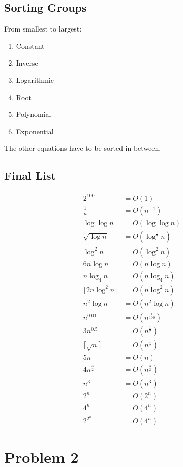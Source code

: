 \documentclass{article}
\begin{document}
\subsection{Sorting Groups}

From smallest to largest:
\begin{enumerate}
    \item Constant
    \item Inverse
    \item Logarithmic
    \item Root
    \item Polynomial
    \item Exponential
\end{enumerate}

\vspace{5mm}
The other equations have to be sorted in-between.

\subsection{Final List}
\setcounter{equation}{0}
\begin{align}
    2^{100} &= O(1) \\
    \frac{1}{n} &= O(n^{-1}) \\
    \log \log n &= O(\log \log n) \\
    \sqrt{\log n} &= O(\log^{\frac{1}{2}}n) \\
    \log^2 n &= O(\log^2 n) \\
    6n\log n &= O(n\log n) \\
    n \log_4 n &= O(n \log_4 n) \\
    \lfloor 2n \log^2n \rfloor &= O(n \log^2n) \\
    n^2 \log n &= O(n^2 \log n) \\
    n^{0.01} &= O(n^{\frac{1}{100}}) \\
    3n^{0.5} &= O(n^{\frac{1}{2}}) \\
    \lceil \sqrt{n} \rceil &= O(n^{\frac{1}{2}}) \\
    5n &= O(n) \\
    4n^{\frac{3}{2}} &= O(n^{\frac{3}{2}}) \\
    n^3 &= O(n^3) \\
    2^n &= O(2^n) \\
    4^n &= O(4^n) \\
    2^{2^{n}} &= O(4^{n})
\end{align}

\section{Problem 2}
\end{document}
